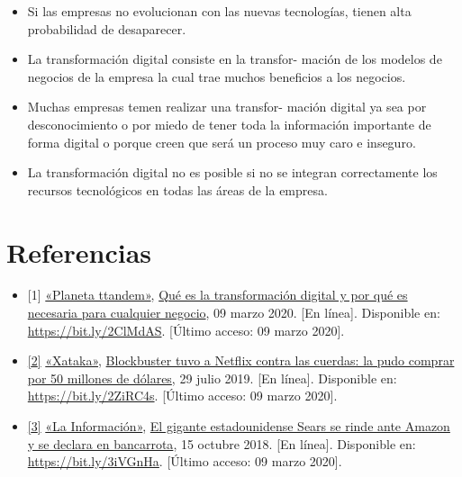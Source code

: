 \documentclass[12pt,spanish,Letterpaper,openany]{book}
\providecommand{\tightlist}{%
  \setlength{\itemsep}{0pt}\setlength{\parskip}{0pt}}
\newcommand{\spacefivemilis}{\vspace{5mm}}
\newcommand{\spacefourmilis}{\vspace{4mm}}
\begin{document}
\begin{itemize}
\tightlist
\item
  Si las empresas no evolucionan con las nuevas tecnologías, tienen alta probabilidad de desaparecer.
  \spacefourmilis
\item
  La transformación digital consiste en la transfor-
  mación de los modelos de negocios de la empresa la cual trae muchos beneficios a los negocios.
  \spacefourmilis
\item
  Muchas empresas temen realizar una transfor-
  mación digital ya sea por desconocimiento o por miedo de tener toda la información importante de forma digital o porque creen que será un proceso muy caro e inseguro.
  \spacefourmilis
\item
  La transformación digital no es posible si no se integran correctamente los recursos tecnológicos en todas las áreas de la empresa.
\end{itemize}

\spacefivemilis

\hypertarget{referencias-1}{%
\section*{Referencias}\label{referencias-1}}

\begin{itemize}
\item
  \hypertarget{articulo02_ref01}{}

  {[}1{]} \href{https://www.ttandem.com/}{«Planeta ttandem»}, \href{https://www.ttandem.com/blog/que-es-la-transformacion-digital-y-por-que-es-necesaria-para-cualquier-negocio}{Qué es la transformación digital y por qué es necesaria para cualquier negocio}, 09 marzo 2020. {[}En línea{]}. Disponible en: \url{https://bit.ly/2ClMdAS}. {[}Último acceso: 09 marzo 2020{]}.
\item
  \hypertarget{articulo02_ref02}{}

  \protect\hyperlink{articulo02_cross02}{{[}2{]}} \href{http://www.xataka.com/}{«Xataka»}, \href{https://www.xataka.com/cine-y-tv/nadie-se-acuerda-blockbuster-tuvo-a-netflix-cuerdas-pudo-comprar-50-millones-dolares/}{Blockbuster tuvo a Netflix contra las cuerdas: la pudo comprar por 50 millones de dólares}, 29 julio 2019. {[}En línea{]}. Disponible en: \url{https://bit.ly/2ZiRC4s}. {[}Último acceso: 09 marzo 2020{]}.
\item
  \hypertarget{articulo02_ref03}{}

  \protect\hyperlink{articulo02_cross03}{{[}3{]}} \href{https://www.lainformacion.com/}{«La Información»}, \href{https://www.lainformacion.com/empresas/el-gigante-estadounidense-sears-se-rinde-ante-amazon-y-se-declara-en-bancarrota/6434093/}{El gigante estadounidense Sears se rinde ante Amazon y se declara en bancarrota}, 15 octubre 2018. {[}En línea{]}. Disponible en: \url{https://bit.ly/3iVGnHa}. {[}Último acceso: 09 marzo 2020{]}.
\end{itemize}
\end{document}
